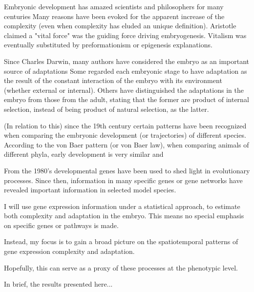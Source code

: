 
Embryonic development has amazed scientists and philosophers for many centuries
%
Many reasons have been evoked for the apparent increase of the complexity (even when complexity has eluded an unique definition).
Aristotle claimed a "vital force" was the guiding force driving embryogenesis.
%
Vitalism was eventually substituted by preformationism or epigenesis explanations.

Since Charles Darwin, many authors have considered the embryo as an important source of adaptations
%
Some regarded each embryonic stage to have adaptation as the result of the constant interaction of the embryo with its environment (whether external or internal).
%
Others have distinguished the adaptations in the embryo from those from the adult, stating that the former are product of internal selection, instead of being product of natural selection, as the latter.

(In relation to this) since the 19th century certain patterns have been recognized when comparing the embryonic development (or trajectories) of different species. 
%
According to the von Baer pattern (or von Baer law), when comparing animals of different phyla, early development is very similar and  

From the 1980's developmental genes have been used to shed light in evolutionary processes.
%
Since then, information in many specific genes or gene networks have revealed important information in selected model species.

I will use gene expression information under a statistical approach, to estimate both complexity and adaptation in the embryo.
This means no special emphasis on specific genes or pathways is made. 

Instead, my focus is to gain a broad picture on the spatiotemporal patterns of gene expression complexity and adaptation.

Hopefully, this can serve as a proxy of these processes at the phenotypic level.

In brief, the results presented here...